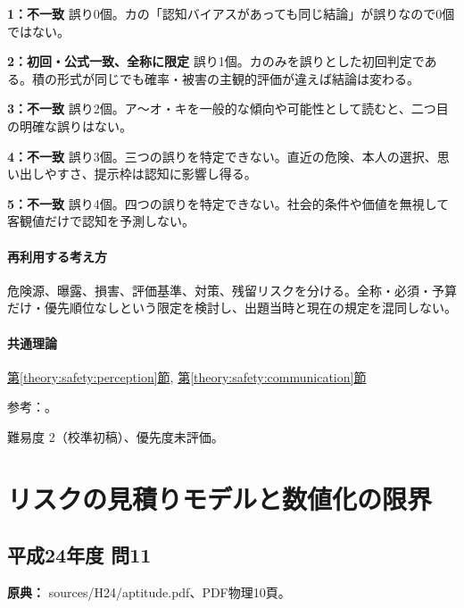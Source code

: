 \noindent\textbf{1：不一致} 誤り0個。カの「認知バイアスがあっても同じ結論」が誤りなので0個ではない。\par

\noindent\textbf{2：初回・公式一致、全称に限定} 誤り1個。カのみを誤りとした初回判定である。積の形式が同じでも確率・被害の主観的評価が違えば結論は変わる。\par

\noindent\textbf{3：不一致} 誤り2個。ア〜オ・キを一般的な傾向や可能性として読むと、二つ目の明確な誤りはない。\par

\noindent\textbf{4：不一致} 誤り3個。三つの誤りを特定できない。直近の危険、本人の選択、思い出しやすさ、提示枠は認知に影響し得る。\par

\noindent\textbf{5：不一致} 誤り4個。四つの誤りを特定できない。社会的条件や価値を無視して客観値だけで認知を予測しない。\par

\paragraph{再利用する考え方} 危険源、曝露、損害、評価基準、対策、残留リスクを分ける。全称・必須・予算だけ・優先順位なしという限定を検討し、出題当時と現在の規定を混同しない。

\paragraph{共通理論} \hyperref[theory:safety:perception]{第\ref*{theory:safety:perception}節}, \hyperref[theory:safety:communication]{第\ref*{theory:safety:communication}節}

\par 参考：\cite{saf_fsc_psych,saf_fsc_glossary}。

\par 難易度 2（校準初稿）、優先度未評価。

\section{リスクの見積りモデルと数値化の限界}

\subsection{平成24年度 問11}
\label{q:h24-reg-apt-11}

\noindent\textbf{原典：} sources/H24/aptitude.pdf、PDF物理10頁。

